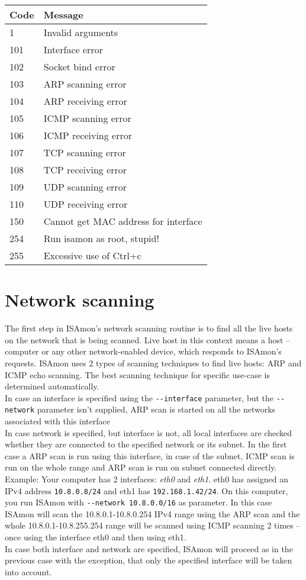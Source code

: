 \documentclass[11pt,a4paper]{article}
\begin{document}
		\begin{tabular}{|l|l|}
			\hline
			\textbf{Code}  & \textbf{Message} \\\hline
			1     & Invalid arguments \\\hline
			101   & Interface error \\\hline
			102   & Socket bind error \\\hline
			103   & ARP scanning error \\\hline
			104   & ARP receiving error \\\hline
			105   & ICMP scanning error \\\hline
			106   & ICMP receiving error \\\hline
			107   & TCP scanning error \\\hline
			108   & TCP receiving error \\\hline
			109   & UDP scanning error \\\hline
			110   & UDP receiving error \\\hline
			150   & Cannot get MAC address for interface \\\hline
			254   & Run isamon as root, stupid! \\\hline
			255   & Excessive use of Ctrl+c \\\hline
		\end{tabular}

\section{Network scanning}
	The first step in ISAmon's network scanning routine is to find all the live hosts on the network that is being scanned. Live host in this context means a host -- computer or any other network-enabled device, which responds to ISAmon's requests. ISAmon uses 2 types of scanning techniques to find live hosts: ARP and ICMP echo scanning. The best scanning technique for specific use-case is determined automatically.\\
	In case an interface is specified using the \texttt{-{}-interface} parameter, but the \texttt{-{}-network} parameter isn't supplied, ARP scan is started on all the networks associated with this interface\\
	In case network is specified, but interface is not, all local interfaces are checked whether they are connected to the specified network or its subnet. In the first case a ARP scan is run using this interface, in case of the subnet, ICMP scan is run on the whole range and ARP scan is run on subnet connected directly. Example: Your computer has 2 interfaces: \emph{eth0} and \emph{eth1}. eth0 has assigned an IPv4 address \texttt{10.8.0.8/24} and eth1 has \texttt{192.168.1.42/24}. On this computer, you run ISAmon with \texttt{-{}-network 10.8.0.0/16} as parameter. In this case ISAmon will scan the 10.8.0.1-10.8.0.254 IPv4 range using the ARP scan and the whole 10.8.0.1-10.8.255.254 range will be scanned using ICMP scanning 2 times -- once using the interface eth0 and then using eth1.\\
	In case both interface and network are specified, ISAmon will proceed as in the previous case with the exception, that only the specified interface will be taken into account.
\end{document}
